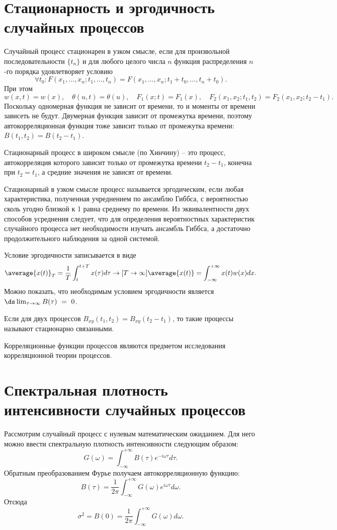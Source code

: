 \section{Стационарность и эргодичность случайных процессов}
Случайный процесс стационарен в узком смысле, если для произвольной
последовательности \( \{t_n\} \) и для любого целого числа \( n \)  функция
распределения \( n \)-го порядка удовлетворяет условию
\[
    \forall t_0:
    F(x_1,\ldots,x_n;t_1,\ldots,t_n) = F(x_1,\ldots,x_n;t_1+t_0,\ldots,t_n+t_0).
\]
При этом
\[
    w(x,t) = w(x),\quad \theta(u,t) = \theta(u),\quad F_1(x;t) = F_1(x),\quad
    F_2(x_1,x_2;t_1,t_2) = F_2(x_1,x_2;t_2-t_1).
\]
Поскольку одномерная функция не зависит от времени, то и моменты от времени
зависеть не будут. Двумерная функция зависит от промежутка времени, поэтому
автокорреляционная функция тоже зависит только от промежутка времени:
\( B(t_1,t_2) = B(t_2-t_1) \).

Стационарный процесс в широком смысле (по Хинчину) -- это процесс,
автокорреляция которого зависит только от промежутка времени \( t_2 - t_1 \),
конечна при \( t_2 = t_1 \), а средние значения не зависят от времени.

Стационарный в узком смысле процесс называется эргодическим, если любая
характеристика, полученная учреднением по ансамблю Гиббса, с вероятностью сколь
угодно близкой к 1 равна среднему по времени. Из эквивалентности двух способов
усреднения следует, что для определения вероятностных характеристик случайного
процесса нет необходимости изучать ансамбль Гиббса, а достаточно
продолжительного наблюдения за одной системой.

Условие эргодичности записывается в виде
\[
    \average{x(t)}_T = \frac{1}{T}\int_t^{t+T} x(\tau)d\tau \to[T\to\infty]
    \average{x(t)} = \int_{-\infty}^{+\infty} x(t)w(x)dx.
\]
Можно показать, что необходимым условием эргодичности является
\(\ds \lim_{\tau\to\infty}B(\tau)~=~0 \).

Если для двух процессов \( B_{xy}(t_1,t_2) = B_{xy}(t_2-t_1) \), то такие
процессы называют стационарно связанными.

Корреляционные функции процессов являются предметом исследования корреляционной
теории процессов.

\section{Спектральная плотность интенсивности случайных процессов}
Рассмотрим случайный процесс с нулевым математическим ожиданием. Для него можно
ввести спектральную плотность интенсивности следующим образом:
\[
    G(\omega) = \int_{-\infty}^{+\infty} B(\tau)e^{-i\omega\tau}d\tau.
\]
Обратным преобразованием Фурье получаем автокорреляционную функцию:
\[
    B(\tau) =
        \frac{1}{2\pi}\int_{-\infty}^{+\infty} G(\omega)e^{i\omega\tau}d\omega.
\]
Отсюда
\[
    \sigma^2 = B(0) = \frac{1}{2\pi}\int_{-\infty}^{+\infty} G(\omega)d\omega.
\]

